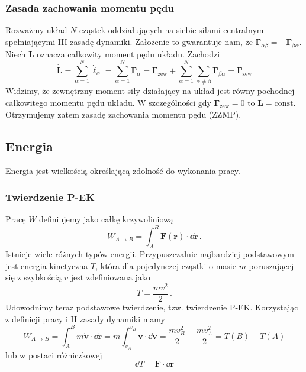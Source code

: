 \documentclass[../main.tex]{subfiles}
\begin{document}
\subsubsection{Zasada zachowania momentu pędu}
Rozważmy układ \(N\) cząstek oddziałujących na siebie siłami centralnym spełniającymi III zasadę
dynamiki. Założenie to gwarantuje nam, że
\(\boldsymbol{\Gamma}_{\alpha\beta}=-\boldsymbol{\Gamma}_{\beta\alpha}\). Niech \(\mathbf{L}\)
oznacza całkowity moment pędu układu. Zachodzi
\begin{equation*}
    \dot{\mathbf{L}}=\sum_{\alpha=1}^N\dot{\boldsymbol{\ell}}_\alpha=\sum_{\alpha=1}^N\boldsymbol{\Gamma}_\alpha=\boldsymbol{\Gamma}_\text{zew}+\sum_{\alpha=1}^N\sum_{\alpha\neq\beta}\boldsymbol{\Gamma}_{\beta\alpha}=\boldsymbol{\Gamma}_\text{zew}
\end{equation*}
Widzimy, że zewnętrzny moment siły działający na układ jest równy pochodnej całkowitego momentu pędu
układu. W szczególności gdy \(\boldsymbol{\Gamma}_\text{zew}=0\) to \(\mathbf{L}=\text{const}\).
Otrzymujemy zatem zasadę zachowania momentu pędu (ZZMP).
\medskip

\noindent{}

\subsection{Energia}
Energia jest wielkością określającą zdolność do wykonania pracy.
\subsubsection{Twierdzenie P-EK}
Pracę \(W\) definiujemy jako całkę krzywoliniową
\begin{equation*}
    W_{A\rightarrow B}=\int_{A}^B\mathbf{F}(\mathbf{r})\cdot \dd\mathbf{r}\,.
\end{equation*}
Istnieje wiele różnych typów energii. Przypuszczalnie najbardziej podstawowym jest energia
kinetyczna \(T\), która dla pojedynczej cząstki o masie \(m\) poruszającej się z szybkością \(v\)
jest zdefiniowana jako
\begin{equation*}
    T=\frac{mv^2}{2}\,.
\end{equation*}
Udowodnimy teraz podstawowe twierdzenie, tzw. twierdzenie P-EK. Korzystając z definicji pracy i II
zasady dynamiki mamy
\begin{equation*}
    W_{A\rightarrow B}=\int_{A}^Bm\dot{\mathbf{v}}\cdot \dd\mathbf{r}=m\int_{v_A}^{v_B}\mathbf{v}\cdot \dd\mathbf{v}=\frac{mv_B^2}{2}-\frac{mv_A^2}{2}=T(B)-T(A)
\end{equation*}
lub w postaci różniczkowej
\begin{equation*}
    \dd T=\mathbf{F}\cdot \dd\mathbf{r}
\end{equation*}
\end{document}

